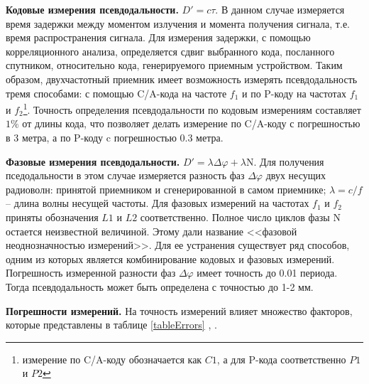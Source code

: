 \documentclass[14pt]{article}
\begin{document}
\textbf{Кодовые измерения псевдодальности.} $D' = c \tau$. В данном случае измеряется время задержки между моментом излучения и момента получения сигнала, т.е. время распространения сигнала. Для измерения задержки, с помощью корреляционного анализа, определяется сдвиг выбранного кода, посланного спутником, относительно кода, генерируемого приемным устройством. Таким образом, двухчастотный приемник имеет возможность измерять псевдодальность тремя способами: с помощью C/A-кода на частоте $f_1$ и по P-коду на частотах $f_1$ и $f_2$\footnote{измерение по C/A-коду обозначается как $C1$, а для P-кода соответственно $P1$ и $P2$}. Точность определения псевдодальности по кодовым измерениям составляет $1\%$ от длины кода, что позволяет делать измерение по C/A-коду с погрешностью в 3 метра, а по P-коду c погрешностью 0.3 метра.

\textbf{Фазовые измерения псевдодальности.} $D' = \lambda \Delta \varphi + \lambda \text{N}$. Для получения пседодальности в этом случае измеряется разность фаз $\Delta\varphi$ двух несущих радиоволн: принятой приемником и сгенерированной в самом приемнике; $\lambda = c / f$ -- длина волны несущей частоты. Для фазовых измерений на частотах $f_1$ и $f_2$ приняты обозначения $L1$ и $L2$ соответственно. Полное число циклов фазы N остается неизвестной величиной. Этому дали название <<фазовой неоднозначностью измерений>>. Для ее устранения существует ряд способов, одним из которых является комбинирование кодовых и фазовых измерений. Погрешность измеренной разности фаз $\Delta\varphi$ имеет точность до 0.01 периода. Тогда псевдодальность может быть определена с точностью до 1-2 мм.

\textbf{Погрешности измерений.} На точность измерений влияет множество факторов, которые представлены в таблице \ref{tableErrors} \cite{hoffmanErrors}, \cite{shebshaevich}.
\end{document}
